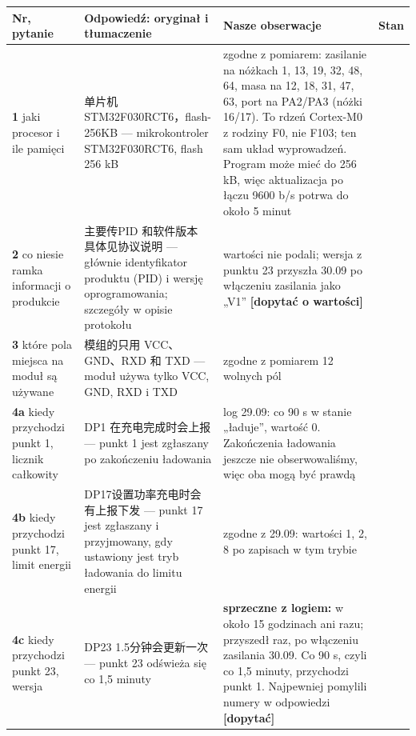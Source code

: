 \documentclass[11pt,a4paper]{article}
\begin{document}
\begin{longtable}{>{\raggedright\arraybackslash}p{3.26cm}>{\raggedright\arraybackslash}p{5.20cm}>{\raggedright\arraybackslash}p{5.43cm}>{\raggedright\arraybackslash}p{0.95cm}}
\toprule
\rowcolor{apteallight}\textbf{Nr, pytanie} & \textbf{Odpowiedź: oryginał i tłumaczenie} & \textbf{Nasze obserwacje} & \textbf{Stan} \\
\midrule\endhead
\bottomrule\endfoot
\textbf{1} jaki procesor i ile pamięci & {\cjkfont 单片机}STM32F030RCT6{\cjkfont ，}flash-256KB — mikrokontroler STM32F030RCT6, flash 256 kB & zgodne z pomiarem: zasilanie na nóżkach 1, 13, 19, 32, 48, 64, masa na 12, 18, 31, 47, 63, port na PA2/PA3 (nóżki 16/17). To rdzeń Cortex-M0 z rodziny F0, nie F103; ten sam układ wyprowadzeń. Program może mieć do 256 kB, więc aktualizacja po łączu 9600 b/s potrwa do około 5 minut & \leavevmode{\symbolfont\color{apgreen}\textbf{✔}} \\
\textbf{2} co niesie ramka informacji o produkcie & {\cjkfont 主要传}PID {\cjkfont 和软件版本} {\cjkfont 具体见协议说明} — głównie identyfikator produktu (PID) i wersję oprogramowania; szczegóły w opisie protokołu & wartości nie podali; wersja z punktu 23 przyszła 30.09 po włączeniu zasilania jako „V1” \textbf{[dopytać o wartości]} & \leavevmode{\symbolfont\color{apamber}\textbf{◐}} \\
\textbf{3} które pola miejsca na moduł są używane & {\cjkfont 模组的只用} VCC{\cjkfont 、}GND{\cjkfont 、}RXD {\cjkfont 和} TXD — moduł używa tylko VCC, GND, RXD i TXD & zgodne z pomiarem 12 wolnych pól & \leavevmode{\symbolfont\color{apgreen}\textbf{✔}} \\
\textbf{4a} kiedy przychodzi punkt 1, licznik całkowity & DP1 {\cjkfont 在充电完成时会上报} — punkt 1 jest zgłaszany po zakończeniu ładowania & log 29.09: co 90 s w stanie „ładuje”, wartość 0. Zakończenia ładowania jeszcze nie obserwowaliśmy, więc oba mogą być prawdą & \leavevmode{\symbolfont\color{apamber}\textbf{◐}} \\
\textbf{4b} kiedy przychodzi punkt 17, limit energii & DP17{\cjkfont 设置功率充电时会有上报下发} — punkt 17 jest zgłaszany i przyjmowany, gdy ustawiony jest tryb ładowania do limitu energii & zgodne z 29.09: wartości 1, 2, 8 po zapisach w tym trybie & \leavevmode{\symbolfont\color{apgreen}\textbf{✔}} \\
\textbf{4c} kiedy przychodzi punkt 23, wersja & DP23 1.5{\cjkfont 分钟会更新一次} — punkt 23 odświeża się co 1,5 minuty & \textbf{sprzeczne z logiem:} w około 15 godzinach ani razu; przyszedł raz, po włączeniu zasilania 30.09. Co 90 s, czyli co 1,5 minuty, przychodzi punkt 1. Najpewniej pomylili numery w odpowiedzi \textbf{[dopytać]} & \leavevmode{\symbolfont\color{apred}\textbf{✘}} \\

\end{longtable}
\end{document}

